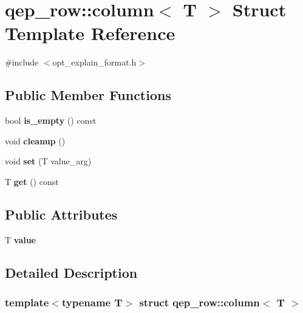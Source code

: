 \hypertarget{structqep__row_1_1column}{}\section{qep\+\_\+row\+:\+:column$<$ T $>$ Struct Template Reference}
\label{structqep__row_1_1column}


{\ttfamily \#include $<$opt\+\_\+explain\+\_\+format.\+h$>$}

\subsection*{Public Member Functions}
\begin{DoxyCompactItemize}
\item 
\mbox{\label{structqep__row_1_1column_af821bf93e7485770c8af8b537a1cb74d}} 
bool {\bfseries is\+\_\+empty} () const
\item 
\mbox{\label{structqep__row_1_1column_afe7b47274c5499592268a1dfe8b6a120}} 
void {\bfseries cleanup} ()
\item 
\mbox{\label{structqep__row_1_1column_aeca2e307db7e4a9c8e7a8d91599b3f09}} 
void {\bfseries set} (T value\+\_\+arg)
\item 
\mbox{\label{structqep__row_1_1column_a8df947798b0c431d0d8481cbde9f1e4d}} 
T {\bfseries get} () const
\end{DoxyCompactItemize}
\subsection*{Public Attributes}
\begin{DoxyCompactItemize}
\item 
\mbox{\label{structqep__row_1_1column_af670edb3c4b657348b6a0d3f606ba21b}} 
T {\bfseries value}
\end{DoxyCompactItemize}


\subsection{Detailed Description}
\subsubsection*{template$<$typename T$>$\newline
struct qep\+\_\+row\+::column$<$ T $>$}

